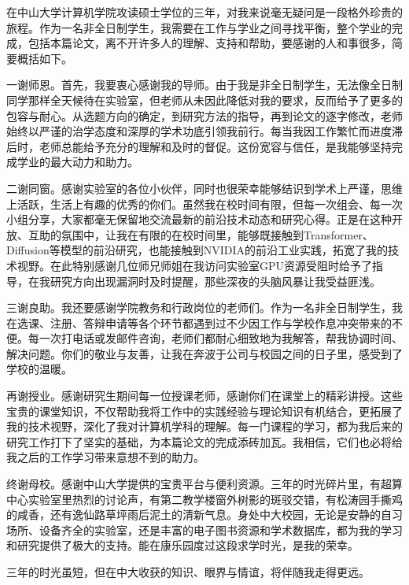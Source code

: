 
\begin{acknowledgements}
在中山大学计算机学院攻读硕士学位的三年，对我来说毫无疑问是一段格外珍贵的旅程。作为一名非全日制学生，我需要在工作与学业之间寻找平衡，整个学业的完成，包括本篇论文，离不开许多人的理解、支持和帮助，要感谢的人和事很多，简要概括如下。

一谢师恩。首先，我要衷心感谢我的导师。由于我是非全日制学生，无法像全日制同学那样全天候待在实验室，但老师从未因此降低对我的要求，反而给予了更多的包容与耐心。从选题方向的确定，到研究方法的指导，再到论文的逐字修改，老师始终以严谨的治学态度和深厚的学术功底引领我前行。每当我因工作繁忙而进度滞后时，老师总能给予充分的理解和及时的督促。这份宽容与信任，是我能够坚持完成学业的最大动力和助力。

二谢同窗。感谢实验室的各位小伙伴，同时也很荣幸能够结识到学术上严谨，思维上活跃，生活上有趣的优秀的你们。虽然我在校时间有限，但每一次组会、每一次小组分享，大家都毫无保留地交流最新的前沿技术动态和研究心得。正是在这种开放、互助的氛围中，让我在有限的在校时间里，能够既接触到Transformer、Diffusion等模型的前沿研究，也能接触到NVIDIA的前沿工业实践，拓宽了我的技术视野。在此特别感谢几位师兄师姐在我访问实验室GPU资源受阻时给予了指导，在我研究方向出现漏洞时及时提醒，那些深夜的头脑风暴让我受益匪浅。

三谢良助。我还要感谢学院教务和行政岗位的老师们。作为一名非全日制学生，我在选课、注册、答辩申请等各个环节都遇到过不少因工作与学校作息冲突带来的不便。每一次打电话或发邮件咨询，老师们都耐心细致地为我解答，帮我协调时间、解决问题。你们的敬业与友善，让我在奔波于公司与校园之间的日子里，感受到了学校的温暖。

再谢授业。感谢研究生期间每一位授课老师，感谢你们在课堂上的精彩讲授。这些宝贵的课堂知识，不仅帮助我将工作中的实践经验与理论知识有机结合，更拓展了我的技术视野，深化了我对计算机学科的理解。每一门课程的学习，都为我后来的研究工作打下了坚实的基础，为本篇论文的完成添砖加瓦。我相信，它们也必将给我之后的工作学习带来意想不到的助力。

终谢母校。感谢中山大学提供的宝贵平台与便利资源。三年的时光碎片里，有超算中心实验室里热烈的讨论声，有第二教学楼窗外树影的斑驳交错，有松涛园手撕鸡的咸香，还有逸仙路草坪雨后泥土的清新气息。身处中大校园，无论是安静的自习场所、设备齐全的实验室，还是丰富的电子图书资源和学术数据库，都为我的学习和研究提供了极大的支持。能在康乐园度过这段求学时光，是我的荣幸。

三年的时光虽短，但在中大收获的知识、眼界与情谊，将伴随我走得更远。

\end{acknowledgements}

